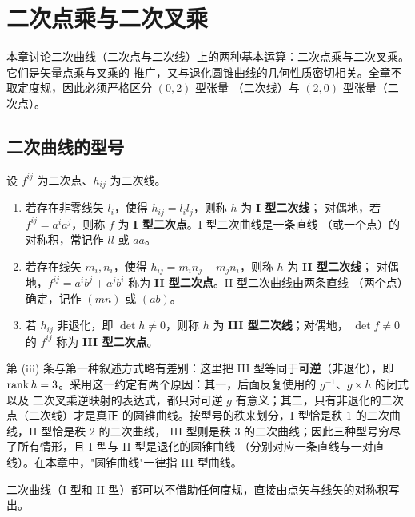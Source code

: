 \chapter{二次点乘与二次叉乘}

本章讨论二次曲线（二次点与二次线）上的两种基本运算：二次点乘与二次叉乘。它们是矢量点乘与叉乘的
推广，又与退化圆锥曲线的几何性质密切相关。全章不取定度规，因此必须严格区分 $(0,2)$ 型张量
（二次线）与 $(2,0)$ 型张量（二次点）。

\section{二次曲线的型号}

\begin{definition}[二次曲线的型号]
设 $f^{ij}$ 为二次点、$h_{ij}$ 为二次线。
\begin{enumerate}[label=(\roman*),itemsep=2pt]
  \item 若存在非零线矢 $l_i$，使得 $h_{ij}=l_il_j$，则称 $h$ 为 \textbf{I 型二次线}；
        对偶地，若 $f^{ij}=a^ia^j$，则称 $f$ 为 \textbf{I 型二次点}。I 型二次曲线是一条直线
        （或一个点）的对称积，常记作 $ll$ 或 $aa$。
  \item 若存在线矢 $m_i,n_i$，使得 $h_{ij}=m_in_j+m_jn_i$，则称 $h$ 为 \textbf{II 型二次线}；
        对偶地，$f^{ij}=a^ib^j+a^jb^i$ 称为 \textbf{II 型二次点}。II 型二次曲线由两条直线
        （两个点）确定，记作 $(mn)$ 或 $(ab)$。
  \item 若 $h_{ij}$ 非退化，即 $\det h\ne0$，则称 $h$ 为 \textbf{III 型二次线}；对偶地，
        $\det f\ne0$ 的 $f^{ij}$ 称为 \textbf{III 型二次点}。
\end{enumerate}
\end{definition}

\begin{remark}
第 (iii) 条与第一种叙述方式略有差别：这里把 III 型等同于\textbf{可逆}（非退化），即
$\operatorname{rank} h=3$。采用这一约定有两个原因：其一，后面反复使用的 $g^{-1}$、$g\times h$ 的闭式以及
二次叉乘逆映射的表达式，都只对可逆 $g$ 有意义；其二，只有非退化的二次点（二次线）才是真正
的圆锥曲线。按型号的秩来划分，I 型恰是秩 $1$ 的二次曲线，II 型恰是秩 $2$ 的二次曲线，
III 型则是秩 $3$ 的二次曲线；因此三种型号穷尽了所有情形，且 I 型与 II 型是退化的圆锥曲线
（分别对应一条直线与一对直线）。在本章中，"圆锥曲线"一律指 III 型曲线。
\end{remark}

二次曲线（I 型和 II 型）都可以不借助任何度规，直接由点矢与线矢的对称积写出。

